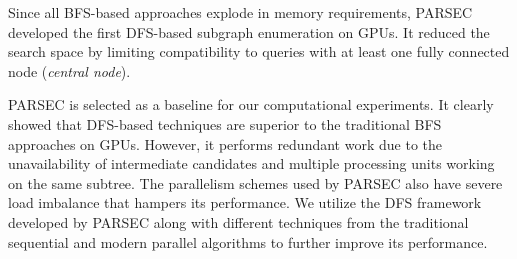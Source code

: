 Since all BFS-based approaches explode in memory requirements, PARSEC \cite{PARSEC_VD} developed the first DFS-based subgraph enumeration on GPUs.
It reduced the search space by limiting compatibility to queries with at least one fully connected node (\textit{central node}).

PARSEC \cite{PARSEC_VD} is selected as a baseline for our computational experiments. It clearly showed that DFS-based techniques are superior to the traditional BFS approaches on GPUs.
However, it performs redundant work due to the unavailability of intermediate candidates and multiple processing units working on the same subtree.
The parallelism schemes used by PARSEC also have severe load imbalance that hampers its performance.
We utilize the DFS framework developed by PARSEC along with different techniques from the traditional sequential and modern parallel algorithms to further improve its performance.